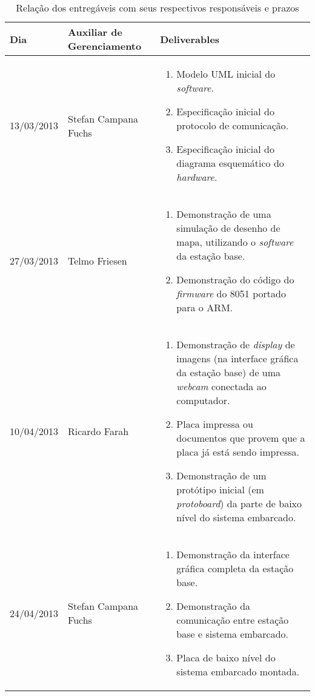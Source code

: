 \begin{table}[!h]
  \centering
  \caption{Relação dos entregáveis com seus respectivos responsáveis e prazos}
  \begin{tabular}{p{3cm}|p{4cm}||p{7cm}}
    \toprule
    \textbf{Dia}   & \textbf{Auxiliar de Gerenciamento} & \textbf{Deliverables} \\
    \hline
    13/03/2013 & Stefan Campana Fuchs & 
    \begin{enumerate}[topsep=0pt, partopsep=0pt, itemsep=0pt]
      \item Modelo UML inicial do \textit{software}.
      \item Especificação inicial do protocolo de comunicação.
      \item Especificação inicial do diagrama esquemático do \textit{hardware}.
    \end{enumerate}\\
    \hline
    27/03/2013 & Telmo Friesen & 
    \begin{enumerate}[topsep=0pt, partopsep=0pt, itemsep=0pt]
      \item Demonstração de uma simulação de desenho de mapa, utilizando o \textit{software} da estação base.
      \item Demonstração do código do \textit{firmware} do 8051 portado para o ARM.
    \end{enumerate}\\
    \hline
    10/04/2013 & Ricardo Farah & 
    \begin{enumerate}[topsep=0pt, partopsep=0pt, itemsep=0pt]
      \item Demonstração de \textit{display} de imagens (na interface gráfica da estação base) de uma \textit{webcam} conectada ao computador.
      \item Placa impressa ou documentos que provem que a placa já está sendo impressa.
      \item Demonstração de um protótipo inicial (em \textit{protoboard}) da parte de baixo nível do sistema embarcado.
    \end{enumerate}\\
    \hline
    24/04/2013 & Stefan Campana Fuchs & 
    \begin{enumerate}[topsep=0pt, partopsep=0pt, itemsep=0pt]
      \item Demonstração da interface gráfica completa da estação base.
      \item Demonstração da comunicação entre estação base e sistema embarcado.
      \item Placa de baixo nível do sistema embarcado montada.
    \end{enumerate}\\
    \bottomrule
    \end{tabular}%
  \label{tab:deliverables}%
\end{table}%

